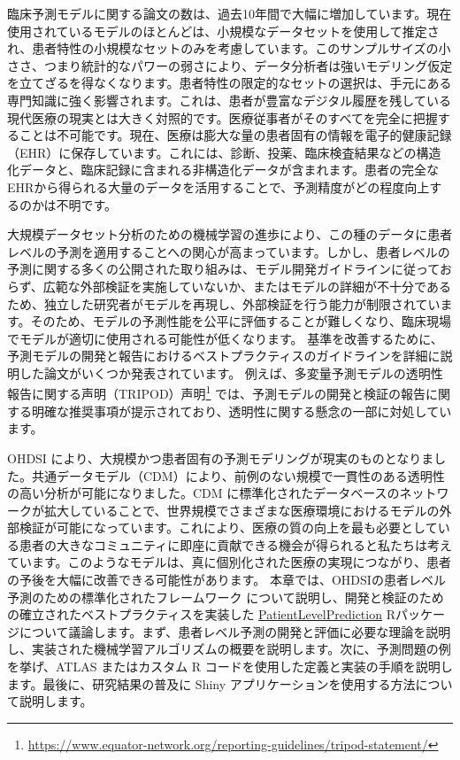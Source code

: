 \documentclass[
  11pt]{book}
\theoremstyle{definition}
\theoremstyle{definition}
\theoremstyle{definition}
\theoremstyle{definition}
\theoremstyle{remark}
\begin{document}
臨床予測モデルに関する論文の数は、過去10年間で大幅に増加しています。現在使用されているモデルのほとんどは、小規模なデータセットを使用して推定され、患者特性の小規模なセットのみを考慮しています。このサンプルサイズの小ささ、つまり統計的なパワーの弱さにより、データ分析者は強いモデリング仮定を立てざるを得なくなります。患者特性の限定的なセットの選択は、手元にある専門知識に強く影響されます。これは、患者が豊富なデジタル履歴を残している現代医療の現実とは大きく対照的です。医療従事者がそのすべてを完全に把握することは不可能です。現在、医療は膨大な量の患者固有の情報を電子的健康記録（EHR）に保存しています。これには、診断、投薬、臨床検査結果などの構造化データと、臨床記録に含まれる非構造化データが含まれます。患者の完全なEHRから得られる大量のデータを活用することで、予測精度がどの程度向上するのかは不明です。 

大規模データセット分析のための機械学習の進歩により、この種のデータに患者レベルの予測を適用することへの関心が高まっています。しかし、患者レベルの予測に関する多くの公開された取り組みは、モデル開発ガイドラインに従っておらず、広範な外部検証を実施していないか、またはモデルの詳細が不十分であるため、独立した研究者がモデルを再現し、外部検証を行う能力が制限されています。そのため、モデルの予測性能を公平に評価することが難しくなり、臨床現場でモデルが適切に使用される可能性が低くなります。 基準を改善するために、予測モデルの開発と報告におけるベストプラクティスのガイドラインを詳細に説明した論文がいくつか発表されています。 例えば、多変量予測モデルの透明性報告に関する声明（TRIPOD）声明\footnote{\url{https://www.equator-network.org/reporting-guidelines/tripod-statement/}} では、予測モデルの開発と検証の報告に関する明確な推奨事項が提示されており、透明性に関する懸念の一部に対処しています。  

OHDSI により、大規模かつ患者固有の予測モデリングが現実のものとなりました。共通データモデル（CDM）により、前例のない規模で一貫性のある透明性の高い分析が可能になりました。CDM に標準化されたデータベースのネットワークが拡大していることで、世界規模でさまざまな医療環境におけるモデルの外部検証が可能になっています。これにより、医療の質の向上を最も必要としている患者の大きなコミュニティに即座に貢献できる機会が得られると私たちは考えています。このようなモデルは、真に個別化された医療の実現につながり、患者の予後を大幅に改善できる可能性があります。 本章では、OHDSIの患者レベル予測のための標準化されたフレームワーク \citep{reps2018} について説明し、開発と検証のための確立されたベストプラクティスを実装した \href{https://ohdsi.github.io/PatientLevelPrediction/}{PatientLevelPrediction} Rパッケージについて議論します。まず、患者レベル予測の開発と評価に必要な理論を説明し、実装された機械学習アルゴリズムの概要を説明します。次に、予測問題の例を挙げ、ATLAS またはカスタム R コードを使用した定義と実装の手順を説明します。最後に、研究結果の普及に Shiny アプリケーションを使用する方法について説明します。
\end{document}
